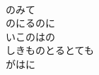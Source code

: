 \documentclass[10pt,b5j]{tarticle} %
\begin{document}
\begin{enumerate}
\begin{minipage}[c]{\blocksize}
        \vspace{\linespace}
        \item~\\
        のみて\\
        のにるのに\\
        いこのはの\\
        しきものとるとても\\
        がはに
    
    \end{minipage}
\end{enumerate} %
\end{document}
